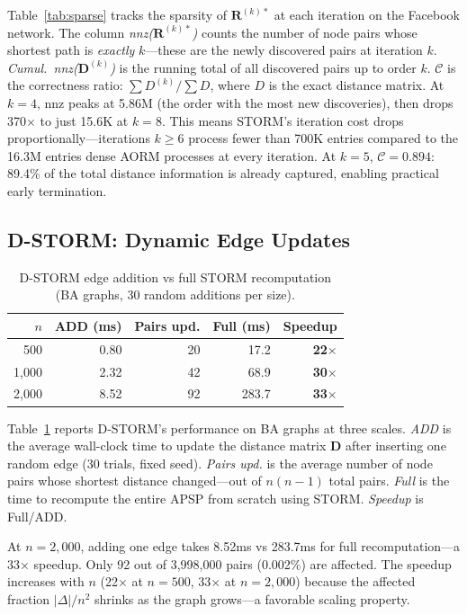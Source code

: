 \documentclass[journal]{IEEEtran}
\begin{document}
Table~\ref{tab:sparse} tracks the sparsity of $\mathbf{R}^{(k)*}$ at each iteration on the Facebook network. The column \emph{nnz($\mathbf{R}^{(k)*}$)} counts the number of node pairs whose shortest path is \emph{exactly} $k$---these are the newly discovered pairs at iteration $k$. \emph{Cumul.\ nnz($\mathbf{D}^{(k)}$)} is the running total of all discovered pairs up to order $k$. \emph{$\mathcal{C}$} is the correctness ratio: $\sum D^{(k)} / \sum D$, where $D$ is the exact distance matrix. At $k=4$, nnz peaks at 5.86M (the order with the most new discoveries), then drops 370$\times$ to just 15.6K at $k=8$. This means STORM's iteration cost drops proportionally---iterations $k \geq 6$ process fewer than 700K entries compared to the 16.3M entries dense AORM processes at every iteration. At $k=5$, $\mathcal{C}=0.894$: 89.4\% of the total distance information is already captured, enabling practical early termination.


\subsection{D-STORM: Dynamic Edge Updates}

\begin{table}[t]
\centering
\caption{D-STORM edge addition vs full STORM recomputation (BA graphs, 30 random additions per size).}
\label{tab:dyn}
\begin{tabular}{@{}rrrrr@{}}
\toprule
$n$ & \textbf{ADD (ms)} & \textbf{Pairs upd.} & \textbf{Full (ms)} & \textbf{Speedup} \\
\midrule
500 & 0.80 & 20 & 17.2 & \textbf{22$\times$} \\
1,000 & 2.32 & 42 & 68.9 & \textbf{30$\times$} \\
2,000 & 8.52 & 92 & 283.7 & \textbf{33$\times$} \\
\bottomrule
\end{tabular}
\end{table}

Table~\ref{tab:dyn} reports D-STORM's performance on BA graphs at three scales. \emph{ADD} is the average wall-clock time to update the distance matrix $\mathbf{D}$ after inserting one random edge (30 trials, fixed seed). \emph{Pairs upd.} is the average number of node pairs whose shortest distance changed---out of $n(n-1)$ total pairs. \emph{Full} is the time to recompute the entire APSP from scratch using STORM. \emph{Speedup} is Full/ADD.

At $n=2{,}000$, adding one edge takes 8.52ms vs 283.7ms for full recomputation---a 33$\times$ speedup. Only 92 out of 3,998,000 pairs (0.002\%) are affected. The speedup increases with $n$ (22$\times$ at $n=500$, 33$\times$ at $n=2{,}000$) because the affected fraction $|\Delta|/n^2$ shrinks as the graph grows---a favorable scaling property.
\end{document}
